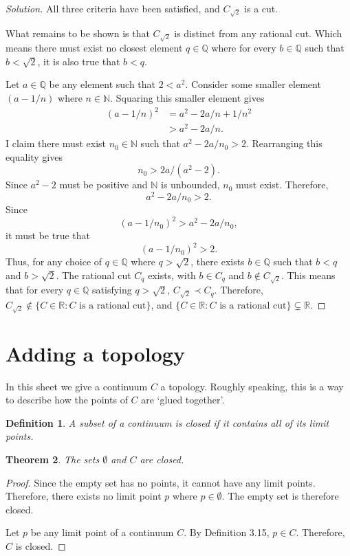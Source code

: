 \documentclass{amsart}
\newtheorem{theorem}{Theorem}
\newtheorem{definition}[theorem]{Definition}
\newcommand{\N}{\mathbb N}
\newcommand{\Q}{\mathbb Q}
\newcommand{\R}{\mathbb R}
\newcommand{\1}{\mathds{1}}
\def \R {{\mathbb {R}}}
\def \N {{\mathbb {N}}}
\numberwithin{equation}{section}
\numberwithin{theorem}{section}
\begin{document}
\begin{proof}[Solution]
	All three criteria have been satisfied, and $C_{\sqrt{2}}$ is a cut. 
	
	What remains to be shown is that $C_{\sqrt{2}}$ is distinct from any rational cut. Which means there must exist no closest element $q\in\Q$ where for every $b\in\Q$ such that $b<\sqrt{2}$, it is also true that $b<q$. 
	
	Let $a\in\Q$ be any element such that $2<a^2$. Consider some smaller element $(a-1/n)$ where $n\in\N$. Squaring this smaller element gives
	\[\begin{split}
		(a-1/n)^2 &= a^2 - 2a/n + 1/n^2\\
		&>a^2 - 2a/n.
	\end{split}\]
	I claim there must exist $n_0\in\N$ such that $a^2 - 2a/n_0 > 2$. Rearranging this equality gives $$n_0 > 2a/(a^2-2).$$ Since $a^2-2$ must be positive and $\N$ is unbounded, $n_0$ must exist. Therefore, $$a^2 - 2a/n_0 > 2.$$ Since $$(a-1/n_0)^2 > a^2 - 2a/n_0,$$ it must be true that $$(a-1/n_0)^2 > 2.$$ Thus, for any choice of $q\in\Q$ where $q>\sqrt{2}$, there exists $b\in\Q$ such that $b<q$ and $b>\sqrt{2}$. The rational cut $C_q$ exists, with $b\in C_q$ and $b\notin C_{\sqrt{2}}$. This means that for every $q\in \Q$ satisfying $q> \sqrt{2}$, $C_{\sqrt{2}} \prec C_q$. Therefore, $C_{\sqrt{2}} \notin \{C\in\R: C \text{ is a rational cut}\}$, and $\{C\in\R: C \text{ is a rational cut}\}\subsetneq \R$. 
	
\end{proof}






\bigskip \section{Adding a topology}

In this sheet we give a continuum $C$ a topology.  Roughly speaking, this is a way to describe how the points of $C$ are `glued together'.  

\medskip




\begin{definition}
A subset of a continuum is \emph{closed} if it contains all of its limit points.
\end{definition}

\begin{theorem}  The sets $\emptyset$ and $C$ are closed.
\end{theorem}

\begin{proof}
	Since the empty set has no points, it cannot have any limit points. Therefore, there exists no limit point $p$ where $p\in\emptyset$. The empty set is therefore closed.
	
	Let $p$ be any limit point of a continuum $C$. By Definition 3.15, $p\in C$. Therefore, $C$ is closed.
\end{proof}
\end{document}
